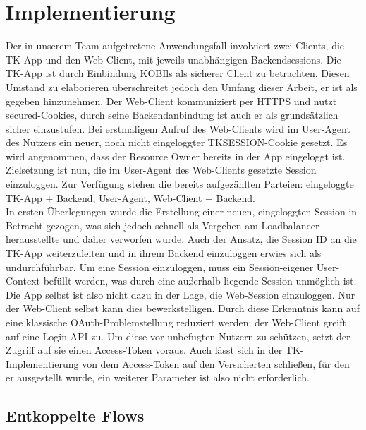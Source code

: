 \chapter{Implementierung} Der in unserem Team aufgetretene Anwendungsfall
involviert zwei Clients, die TK-App und den Web-Client, mit jeweils unabhängigen
Backendsessions. Die TK-App ist durch Einbindung KOBIls als sicherer Client zu
betrachten. Diesen Umstand zu elaborieren überschreitet jedoch den Umfang dieser
Arbeit, er ist als gegeben hinzunehmen. Der Web-Client kommuniziert per HTTPS
und nutzt secured-Cookies, durch seine Backendanbindung ist auch er als
grundsätzlich sicher einzustufen. Bei erstmaligem Aufruf des Web-Clients wird im
User-Agent des Nutzers ein neuer, noch nicht eingeloggter TKSESSION-Cookie
gesetzt. Es wird angenommen, dass der Resource Owner bereits in der App
eingeloggt ist. Zielsetzung ist nun, die im User-Agent des Web-Clients gesetzte
Session einzuloggen. Zur Verfügung stehen die bereits aufgezählten Parteien:
eingeloggte TK-App + Backend, User-Agent, Web-Client + Backend.
\\
In ersten Überlegungen wurde die Erstellung einer neuen, eingeloggten Session
in Betracht gezogen, was sich jedoch schnell als Vergehen am Loadbalancer
herausstellte und daher verworfen wurde. Auch der Ansatz, die Session ID an die
TK-App weiterzuleiten und in ihrem Backend einzuloggen erwies sich als
undurchführbar. Um eine Session einzuloggen, muss ein Session-eigener
User-Context befüllt werden, was durch eine außerhalb liegende Session unmöglich
ist. 
\\
Die App selbst ist also nicht dazu in der Lage, die Web-Session einzuloggen.
Nur der Web-Client selbst kann dies bewerkstelligen. Durch diese Erkenntnis kann
auf eine klassische \gls{OAuth}-Problemstellung reduziert werden: der Web-Client
greift auf eine Login-API zu. Um diese vor unbefugten Nutzern zu schützen,
setzt der Zugriff auf sie einen Access-Token voraus. Auch lässt sich in der TK-
Implementierung von dem Access-Token auf den Versicherten schließen, für den er
ausgestellt wurde, ein weiterer Parameter ist also nicht erforderlich.
\section{Entkoppelte Flows}

